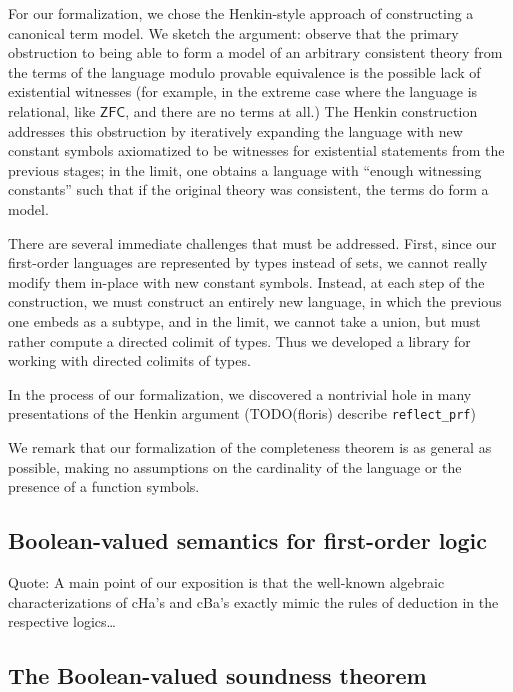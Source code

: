 \documentclass[a4paper,USenglish,cleveref, autoref]{lipics-v2019}
\begin{document}
For our formalization, we chose the Henkin-style approach of constructing a canonical term model. We sketch the argument: observe that the primary obstruction to being able to form a model of an arbitrary consistent theory from the terms of the language modulo provable equivalence is the possible lack of existential witnesses (for example, in the extreme case where the language is relational, like $\mathsf{ZFC}$, and there are no terms at all.) The Henkin construction addresses this obstruction by iteratively expanding the language with new constant symbols axiomatized to be witnesses for existential statements from the previous stages; in the limit, one obtains a language with ``enough witnessing constants'' such that if the original theory was consistent, the terms do form a model.

There are several immediate challenges that must be addressed. First, since our first-order languages are represented by types instead of sets, we cannot really modify them in-place with new constant symbols. Instead, at each step of the construction, we must construct an entirely new language, in which the previous one embeds as a subtype, and in the limit, we cannot take a union, but must rather compute a directed colimit of types. Thus we developed a library for working with directed colimits of types.

In the process of our formalization, we discovered a nontrivial hole in many presentations of the Henkin argument (TODO(floris) describe \lstinline{reflect_prf})

We remark that our formalization of the completeness theorem is as general as possible, making no assumptions on the cardinality of the language or the presence of a function symbols.

\subsection{Boolean-valued semantics for first-order logic}


Quote: %
  A main point of our exposition is that the
  well-known algebraic characterizations of cHa’s and cBa’s exactly mimic the rules of
  deduction in the respective logics\ldots{}

\subsection{The Boolean-valued soundness theorem}
\end{document}
